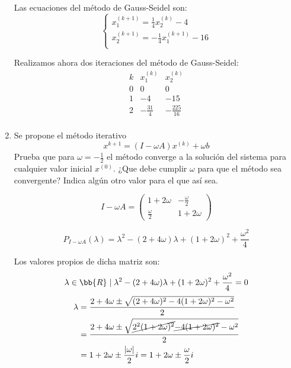 \begin{ejercicio}
\begin{enumerate}
        Las ecuaciones del método de Gauss-Seidel son:
        \begin{equation*}
            \left\{\begin{array}{l}
                x_1^{(k+1)} = \frac{1}{4}x_2^{(k)} - 4 \\
                x_2^{(k+1)} = -\frac{1}{4}x_1^{(k+1)} - 16\\
            \end{array} \right.
        \end{equation*}

        Realizamos ahora dos iteraciones del método de Gauss-Seidel:
        \begin{equation*}
            \begin{array}{c|c|c}
                k & x_1^{(k)} & x_2^{(k)} \\ \hline
                0 & 0 & 0 \\
                1 & -4 & -15 \\
                2 & -\frac{31}{4} & -\frac{225}{16} \\
            \end{array}
        \end{equation*}


        \item Se propone el método iterativo
        $$x^{k+1} = (I-\omega A)x^{(k)} + \omega b$$
        Prueba que para $\omega=-\frac{1}{2}$ el método converge a la solución del sistema para cualquier valor inicial $x^{(0)}$. ¿Que debe cumplir $\omega$ para que el método sea convergente? Indica algún otro valor para el que así sea.

        \begin{equation*}
            I-\omega A = \left( \begin{array}{cc}
                1+2\omega & -\frac{\omega}{2} \\
                \frac{\omega}{2} & 1+2\omega
            \end{array}\right)
        \end{equation*}

        \begin{equation*}
            P_{I-\omega A}(\lambda) = \lambda^2 - (2+4\omega)\lambda + (1+2\omega)^2 + \frac{\omega^2}{4}
        \end{equation*}

        Los valores propios de dicha matriz son: $$\lambda\in \bb{R} \mid \lambda^2 - (2+4\omega)\lambda + (1+2\omega)^2 + \frac{\omega^2}{4} =0$$
        \begin{equation*}\begin{split}
            \lambda &= \frac{2+4\omega \pm \sqrt{(2+4\omega)^2 -4(1+2\omega)^2 - \omega^2}}{2}\\
            &= \frac{2+4\omega \pm \sqrt{\cancel{2^2(1+2\omega)^2} \cancel{-4(1+2\omega)^2} - \omega^2}}{2} \\
            &= 1+2\omega \pm \frac{|\omega|}{2}i = 1 + 2\omega \pm \frac{\omega}{2}i
        \end{split}\end{equation*}


\end{enumerate}
\end{ejercicio}

